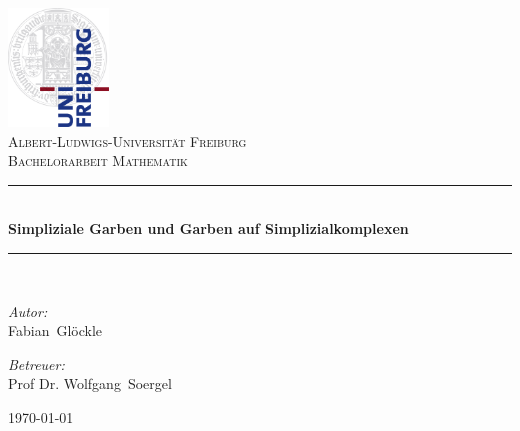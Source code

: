 
\thispagestyle{empty}

\begin{center}

\includegraphics[width=0.2\textwidth]{Uni_Logo-Grundversion_E1_A4_CMYK}\\[1cm]   

\textsc{\LARGE Albert-Ludwigs-Universität Freiburg}\\[1.5cm]

\textsc{\Large Bachelorarbeit Mathematik}\\
\vspace*{1.2cm}

\hrule\  \\[0.4cm]
{ \Large \bfseries 
Simpliziale Garben und Garben auf Simplizialkomplexen
}\\[0.4cm]

\hrule\  \\[1.5cm]

\begin{minipage}{0.49\textwidth}
\begin{flushleft} \large
\emph{Autor:}\\
Fabian~Glöckle
\end{flushleft}
\end{minipage}
\begin{minipage}{0.49\textwidth}
\begin{flushright} \large
\emph{Betreuer:} \\
Prof Dr. Wolfgang~Soergel
\end{flushright}
\end{minipage}

\vfill

{\large \today}

\end{center}

